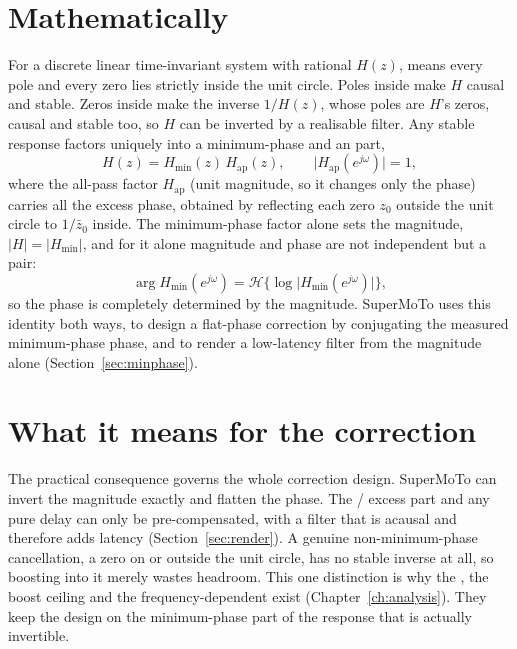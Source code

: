 \section{Mathematically}
For a discrete linear time-invariant system with rational  $H(z)$,  means every pole and every zero lies strictly inside the unit circle. Poles inside make $H$ causal and stable. Zeros inside make the inverse $1/H(z)$, whose poles are $H$'s zeros, causal and stable too, so $H$ can be inverted by a realisable filter. Any stable response factors uniquely into a minimum-phase and an  part,
\begin{equation}
  H(z) = H_{\min}(z)\,H_{\mathrm{ap}}(z),
  \qquad \bigl|H_{\mathrm{ap}}(e^{j\omega})\bigr| = 1,
  \label{eq:minap}
\end{equation}
where the all-pass factor $H_{\mathrm{ap}}$ (unit magnitude, so it changes only the phase) carries all the excess phase, obtained by reflecting each zero $z_0$ outside the unit circle to $1/\bar z_0$ inside. The minimum-phase factor alone sets the magnitude, $|H| = |H_{\min}|$, and for it alone magnitude and phase are not independent but a  pair:
\begin{equation}
  \arg H_{\min}(e^{j\omega})
    = \mathcal{H}\bigl\{\log\bigl|H_{\min}(e^{j\omega})\bigr|\bigr\},
  \label{eq:hilbert}
\end{equation}
so the phase is completely determined by the magnitude. SuperMoTo uses this identity both ways, to design a flat-phase correction by conjugating the measured minimum-phase phase, and to render a low-latency filter from the magnitude alone (Section~\ref{sec:minphase}).

\section{What it means for the correction}
The practical consequence governs the whole correction design. SuperMoTo can invert the magnitude exactly and flatten the  phase. The  / excess part and any pure delay can only be pre-compensated, with a  filter that is acausal and therefore adds latency (Section~\ref{sec:render}). A genuine non-minimum-phase cancellation, a zero on or outside the unit circle, has no stable inverse at all, so boosting into it merely wastes headroom. This one distinction is why the , the boost ceiling and the frequency-dependent  exist (Chapter~\ref{ch:analysis}). They keep the design on the minimum-phase part of the response that is actually invertible.
